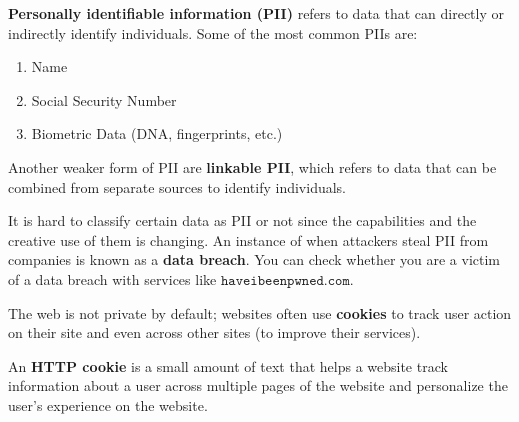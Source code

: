 \documentclass{article}
\begin{document}
  \begin{definition}
  \textbf{Personally identifiable information (PII)} refers to data that can directly or indirectly identify individuals. Some of the most common PIIs are: 
  \begin{enumerate}
      \item Name 
      \item Social Security Number
      \item Biometric Data (DNA, fingerprints, etc.)
  \end{enumerate}
  Another weaker form of PII are \textbf{linkable PII}, which refers to data that can be combined from separate sources to identify individuals. 
  \end{definition}

  It is hard to classify certain data as PII or not since the capabilities and the creative use of them is changing. An instance of when attackers steal PII from companies is known as a \textbf{data breach}. You can check whether you are a victim of a data breach with services like $\texttt{haveibeenpwned.com}$. 

  The web is not private by default; websites often use \textbf{cookies} to track user action on their site and even across other sites (to improve their services).

  \begin{definition}
  An \textbf{HTTP cookie} is a small amount of text that helps a website track information about a user across multiple pages of the website and personalize the user's experience on the website. 
  \end{definition}
\end{document}
